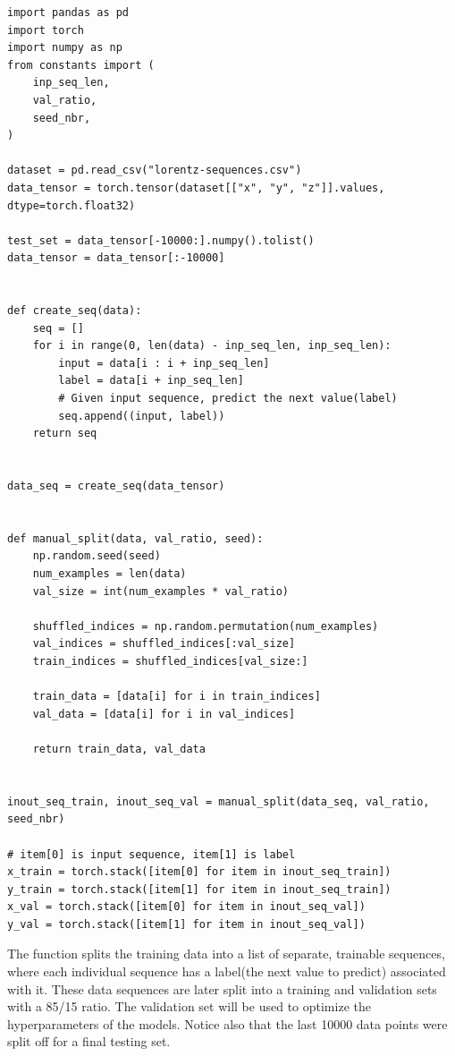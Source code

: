 \documentclass[11pt]{article}
\begin{document}
\begin{lstlisting}[label=datasplit, caption={get\_training\_data.py}]
import pandas as pd
import torch
import numpy as np
from constants import (
    inp_seq_len,
    val_ratio,
    seed_nbr,
)

dataset = pd.read_csv("lorentz-sequences.csv")
data_tensor = torch.tensor(dataset[["x", "y", "z"]].values, dtype=torch.float32)

test_set = data_tensor[-10000:].numpy().tolist()
data_tensor = data_tensor[:-10000]


def create_seq(data):
    seq = []
    for i in range(0, len(data) - inp_seq_len, inp_seq_len):
        input = data[i : i + inp_seq_len]
        label = data[i + inp_seq_len]
        # Given input sequence, predict the next value(label)
        seq.append((input, label))
    return seq


data_seq = create_seq(data_tensor)


def manual_split(data, val_ratio, seed):
    np.random.seed(seed)
    num_examples = len(data)
    val_size = int(num_examples * val_ratio)

    shuffled_indices = np.random.permutation(num_examples)
    val_indices = shuffled_indices[:val_size]
    train_indices = shuffled_indices[val_size:]

    train_data = [data[i] for i in train_indices]
    val_data = [data[i] for i in val_indices]

    return train_data, val_data


inout_seq_train, inout_seq_val = manual_split(data_seq, val_ratio, seed_nbr)

# item[0] is input sequence, item[1] is label
x_train = torch.stack([item[0] for item in inout_seq_train])
y_train = torch.stack([item[1] for item in inout_seq_train])
x_val = torch.stack([item[0] for item in inout_seq_val])
y_val = torch.stack([item[1] for item in inout_seq_val])

\end{lstlisting}

The function splits the training data into a list of separate, trainable sequences, where each individual sequence has a label(the next value to predict) associated with it. These data sequences are later split into a training and validation sets with a 85/15 ratio. The validation set will be used to optimize the hyperparameters of the models. Notice also that the last 10000 data points were split off for a final testing set.
\end{document}
